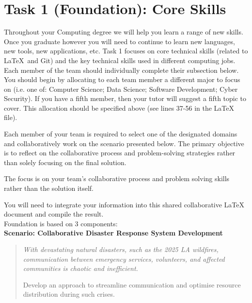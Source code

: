 \documentclass[a4paper, 11pt]{report}
\begin{document}

\tableofcontents





\newpage
\section{Task 1 (Foundation): Core Skills}

Throughout your Computing degree we will help you learn a range of new skills. Once you graduate however you will need to continue to learn new languages, new tools, new applications, etc. Task 1 focuses on core technical skills (related to \LaTeX\ and Git) and the key technical skills used in different computing jobs. Each member of the team should individually complete their subsection below. You should begin by allocating to each team member a different major to focus on (i.e. one of: Computer Science; Data Science; Software Development; Cyber Security). If you have a fifth member, then your tutor will suggest a fifth topic to cover. This allocation should be specified above (see lines 37-56 in the LaTeX file).

Each member of your team is required to select one of the designated domains and collaboratively work on the scenario presented below. The primary objective is to reflect on the collaborative process and problem-solving strategies rather than solely focusing on the final solution.

The focus is on your team’s collaborative process and problem solving skills rather than the solution itself. 

You will need to integrate your information into this shared collaborative LaTeX document and compile the result.\\[2mm]

Foundation is based on 3 components:\\[1mm]

\textbf{Scenario: Collaborative Disaster Response System Development}

{\begin{quote}\itshape
With devastating natural disasters, such as the 2025 LA wildfires, communication between emergency services, volunteers, and affected communities is chaotic and inefficient.

Develop an approach to streamline communication and optimise resource distribution during such crises. 
\end{quote}}
\end{document}
